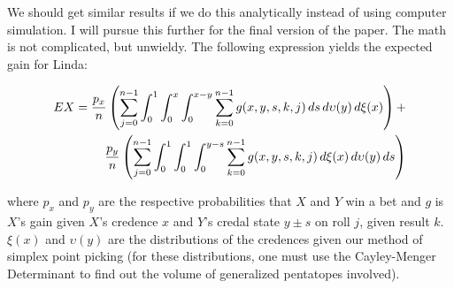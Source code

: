 \documentclass[11pt]{article}
\begin{document}
We should get similar results if we do this analytically instead of
using computer simulation. I will pursue this further for the final
version of the paper. The math is not complicated, but unwieldy. The
following expression yields the expected gain for Linda:

\begin{eqnarray}
  \label{eq:s3}
  EX =
  \frac{p_{x}}{n}\left(\sum_{j=0}^{n-1}\int_{0}^{1}\int_{0}^{x}\int_{0}^{x-y}\sum_{k=0}^{n-1}g(x,y,s,k,j)\,ds\,d\upsilon(y)\,d\xi(x)\right)+
  \notag \\
  \frac{p_{y}}{n}\left(\sum_{j=0}^{n-1}\int_{0}^{1}\int_{0}^{1}\int_{0}^{y-s}\sum_{k=0}^{n-1}g(x,y,s,k,j)\,d\xi(x)\,d\upsilon(y)\,ds\right)
\end{eqnarray}

where $p_{x}$ and $p_{y}$ are the respective probabilities that $X$
and $Y$ win a bet and $g$ is $X$'s gain given $X$'s credence $x$ and
$Y$'s credal state $y\pm{}s$ on roll $j$, given result $k$. $\xi(x)$
and $\upsilon(y)$ are the distributions of the credences given our
method of simplex point picking (for these distributions, one must use
the Cayley-Menger Determinant to find out the volume of generalized
pentatopes involved).

 

\end{document}
